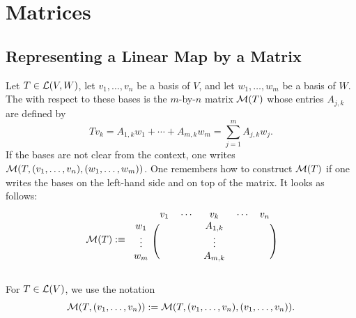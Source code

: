 \section{Matrices}
\subsection{Representing a Linear Map by a Matrix}

\setcounter{thm}{30}
\begin{mydef}
  \label{def: matrix of a linear map}
  Let $T \in \mathcal{L} (V,W)$, let $v_1, \dots, v_n$ be a basis of $V$, and let $w_1, \dots, w_m$ be a basis of $W$. The  with respect to these bases is the $m$-by-$n$ matrix $\mathcal{M}(T)$ whose entries $A_{j,k}$ are defined by
  \begin{equation}
    T v_k = A_{1,k} w_1 + \cdots + A_{m,k} w_m = \sum_{j=1}^{m} A_{j,k} w_j.
  \end{equation}
  If the bases are not clear from the context, one writes $\mathcal{M}(T, (v_1, \dots, v_n),(w_1, \dots, w_m))$. One remembers how to construct $\mathcal{M}(T)$ if one writes the bases on the left-hand side and on top of the matrix. It looks as follows:
  \begin{equation}
    \mathcal{M} (T) :\equiv
      \begin{blockarray}{cccccc}
                 & v_1 & \cdots & v_k     & \cdots & v_n \\
        \begin{block}{c(ccccc)}
          w_1    &     &        & A_{1,k} &        &     \\
          \vdots &     &        & \vdots  &        &     \\
          w_m    &     &        & A_{m,k} &        &     \\
        \end{block}
      \end{blockarray}
  \end{equation}
\end{mydef}

\begin{mydef-non} 
  For $T \in \mathcal{L}(V)$, we use the notation
  \begin{equation}
    \mathcal{M}(T, (v_1, \dots, v_n)) := \mathcal{M}(T, (v_1, \dots, v_n),(v_1, \dots, v_n)).
  \end{equation}
\end{mydef-non}

